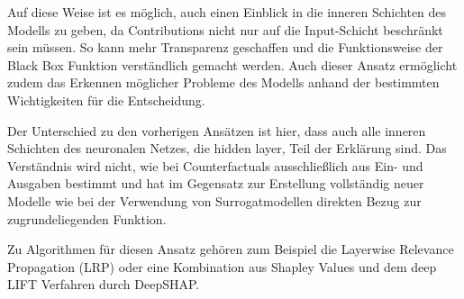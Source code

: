 Auf diese Weise ist es möglich, auch einen Einblick in die inneren Schichten des Modells zu geben, da Contributions nicht nur auf die Input-Schicht beschränkt sein müssen. So kann mehr Transparenz geschaffen und die Funktionsweise der Black Box Funktion verständlich gemacht werden. Auch dieser Ansatz ermöglicht zudem das Erkennen möglicher Probleme des Modells anhand der bestimmten Wichtigkeiten für die Entscheidung. \cite{} 

Der Unterschied zu den vorherigen Ansätzen ist hier, dass auch alle inneren Schichten des neuronalen Netzes, die hidden layer, Teil der Erklärung sind. Das Verständnis wird nicht, wie bei Counterfactuals ausschließlich aus Ein- und Ausgaben bestimmt und hat im Gegensatz zur Erstellung vollständig neuer Modelle wie bei der Verwendung von Surrogatmodellen direkten Bezug zur zugrundeliegenden Funktion. \cite{}  

Zu Algorithmen für diesen Ansatz gehören zum Beispiel die Layerwise Relevance Propagation (LRP) \cite{MontavonLRP} oder eine Kombination aus Shapley Values und dem deep LIFT Verfahren durch DeepSHAP. \cite{} 